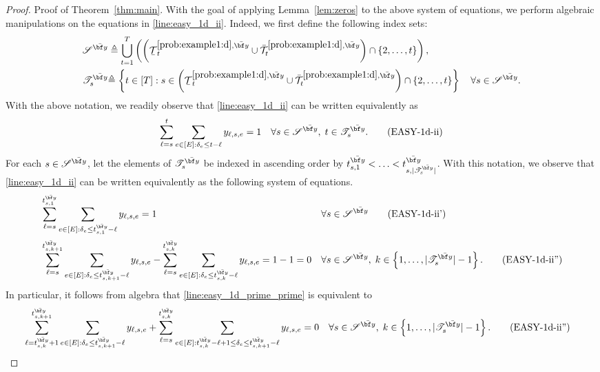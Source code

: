 \documentclass[nonblindrev,mnsc]{informs3} %
\newcommand{\by}{{\bf y}}
\newcommand{\ubar}[1]{\text{\b{$#1$}}}
\begin{document}
\begin{APPENDICES}
\begin{proof}{Proof of Theorem~\ref{thm:main}. }
With the goal of applying Lemma~\ref{lem:zeros} to the above system of equations, we perform algebraic manipulations on the equations in \eqref{line:easy_1d_ii}. Indeed, we first define the following index sets:
 \begin{align*}
 \mathscr{S}^{\bar{\by}} &\triangleq \bigcup_{t =1}^T \left( \left( \ubar{\mathcal{T}}^{\ref{prob:example1:d},\bar{\by}}_t  \cup \bar{\mathcal{T}}^{\ref{prob:example1:d},\bar{\by}}_t\right) \cap  \{2,\ldots,t\}\right) ,\\
 \mathscr{T}_s^{\bar{\by}} &{\triangleq \left \{ t \in [T]: s \in \left(\ubar{\mathcal{T}}^{\ref{prob:example1:d}, \bar{\by}}_t \cup \bar{\mathcal{T}}^{\ref{prob:example1:d},\bar{\by}}_t \right) \cap  \{2,\ldots,t\} \right \} \quad  \forall s \in \mathscr{S}^{\bar{\by}}}.
 \end{align*} 
 With the above notation, we readily observe that  \eqref{line:easy_1d_ii} can be written equivalently  as 
 \begin{align*}
 \sum_{\ell=s}^t \sum_{e\in[E]: \delta_e\le t-\ell} y_{\ell,s,e}   = 1 \quad\forall s \in \mathscr{S}^{\bar{\by}}, \; t \in \mathscr{T}^{\bar{\by}}_s. \tag{EASY-1d-ii}
 \end{align*}
For each $s \in \mathscr{S}^{\bar{\by}}$, let the elements of $\mathscr{T}_s^{\bar{\by}}$ be indexed in ascending order by $t_{s,1}^{\bar{\by}} < \ldots < t_{s,| \mathscr{T}_s^{\bar{\by}}|}^{\bar{\by}}$. 
With this notation, we observe that \eqref{line:easy_1d_ii}  can be written equivalently as  the following system of equations. %
 \begin{align}
 &\sum_{\ell=s}^{t_{s,1}^{\bar{\by}}} \sum_{e\in[E]: \delta_e\le t_{s,1}^{\bar{\by}}-\ell} y_{\ell,s,e}  = 1 && \forall s \in \mathscr{S}^{\bar{\by}}  \tag{EASY-1d-ii'} \label{line:easy_1d_prime}\\
  &\sum_{\ell=s}^{t_{s,k+1}^{\bar{\by}}} \sum_{e\in [E]: \delta_e\le t_{s,k+1}^{\bar{\by}} -\ell} y_{\ell,s,e}  - \sum_{\ell=s}^{t_{s,k}^{\bar{\by}}} \sum_{e\in [E]: \delta_e\le t_{s,k}^{\bar{\by}} -\ell} y_{\ell,s,e} = 1-1=0 && \forall s \in \mathscr{S}^{\bar{\by}}, \; k \in \left\{1,\ldots,|\mathscr{T}_s^{\bar{\by}}| - 1 \right \}.  \tag{EASY-1d-ii''} \label{line:easy_1d_prime_prime}
 \end{align}
 In particular, it follows from algebra that  \eqref{line:easy_1d_prime_prime} is equivalent to
 \begin{align*}
       &\sum_{\ell=t_{s,k}^{\bar{\by}}+1}^{t_{s,k+1}^{\bar{\by}}} \sum_{e\in [E]: \delta_e\le t_{s,k+1}^{\bar{\by}} -\ell} y_{\ell,s,e}  +  \sum_{\ell=s}^{t_{s,k}^{\bar{\by}}} \sum_{e\in [E]:t_{s,k}^{\bar{\by}} -\ell + 1 \le \delta_e\le t_{s,k+1}^{\bar{\by}} -\ell} y_{\ell,s,e} = 0&& \forall s \in \mathscr{S}^{\bar{\by}}, \; k \in \left\{1,\ldots,|\mathscr{T}_s^{\bar{\by}}| - 1 \right \}.  \tag{EASY-1d-ii''} \label{line:easy_1d_prime_prime}
 \end{align*}
 

\end{proof}
\end{APPENDICES}
\end{document}
